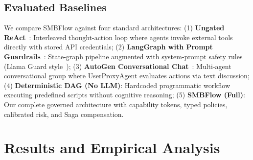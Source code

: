 \documentclass[conference]{IEEEtran}
\begin{document}
\subsection{Evaluated Baselines}
We compare SMBFlow against four standard architectures:
(1) \textbf{Ungated ReAct}~\cite{yao2023react}: Interleaved thought-action loop where agents invoke external tools directly with stored API credentials;
(2) \textbf{LangGraph with Prompt Guardrails}~\cite{langgraph2024}: State-graph pipeline augmented with system-prompt safety rules (Llama Guard style~\cite{inan2023llamaguard});
(3) \textbf{AutoGen Conversational Chat}~\cite{wu2023autogen}: Multi-agent conversational group where UserProxyAgent evaluates actions via text discussion;
(4) \textbf{Deterministic DAG (No LLM)}: Hardcoded programmatic workflow executing predefined scripts without cognitive reasoning;
(5) \textbf{SMBFlow (Full)}: Our complete governed architecture with capability tokens, typed policies, calibrated risk, and Saga compensation.

\section{Results and Empirical Analysis}
\end{document}
